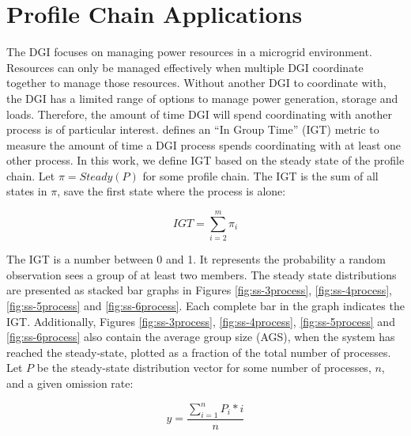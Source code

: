 
\section{Profile Chain Applications}


The DGI focuses on managing power resources in a microgrid environment.
Resources can only be managed effectively when multiple DGI coordinate together to manage those resources.
Without another DGI to coordinate with, the DGI has a limited range of options to manage power generation, storage and loads.
Therefore, the amount of time DGI will spend coordinating with another process is of particular interest.
\cite{CRITIS2012} defines an ``In Group Time'' (IGT) metric to measure the amount of time a DGI process spends coordinating with at least one other process.
In this work, we define IGT based on the steady state of the profile chain.
Let $\pi=Steady(P)$ for some profile chain.
The IGT is the sum of all states in $\pi$, save the first state where the process is alone:

\begin{equation} IGT = \sum_{i=2}^{m} \pi_i \end{equation}

The IGT is a number between 0 and 1.
It represents the probability a random observation sees a group of at least two members.
The steady state distributions are presented as stacked bar graphs in Figures \ref{fig:ss-3process}, \ref{fig:ss-4process}, \ref{fig:ss-5process} and \ref{fig:ss-6process}.
Each complete bar in the graph indicates the IGT.
Additionally, Figures \ref{fig:ss-3process}, \ref{fig:ss-4process}, \ref{fig:ss-5process} and \ref{fig:ss-6process} also contain the average group size (AGS), when the system has reached the steady-state, plotted as a fraction of the total number of processes.
Let $P$ be the steady-state distribution vector for some number of processes, $n$, and a given omission rate:

\begin{equation} y = \frac{\sum_{i=1}^{n} P_{i}*i}{n} \label{eq:ss-means} \end{equation}

